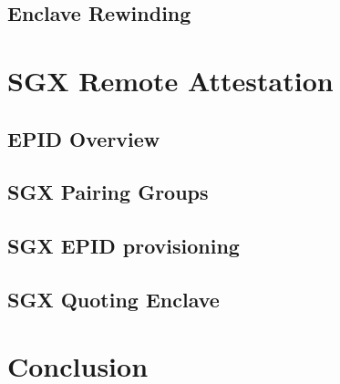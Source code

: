 \documentclass[10pt]{article}
\begin{document}
  \subsection{Enclave Rewinding}
  \label{ssec:rewinding}

  \section{SGX Remote Attestation}
  \label{sec:remoteatt}

  \subsection{EPID Overview}
  \label{ssec:epid}

  \subsection{SGX Pairing Groups}
  \label{ssec:pairings}

  \subsection{SGX EPID provisioning}
  \label{ssec:epidprov}

  \subsection{SGX Quoting Enclave}
  \label{ssec:qe}

  \section{Conclusion}
  \label{sec:conclusion}



\end{document}
